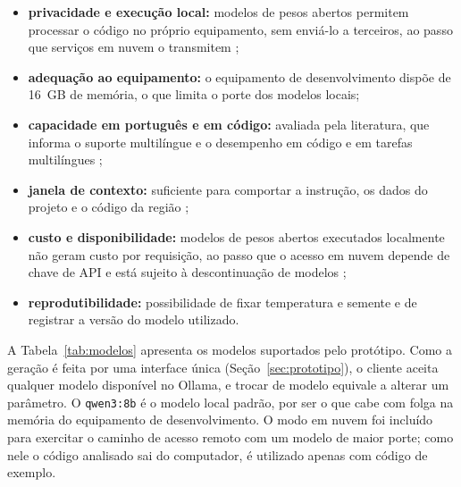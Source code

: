 \documentclass[
    12pt,                   %
    openright,              %
    oneside,                %
    a4paper,                %
    sumario=tradicional,    %
    english,                %
    brazil,                 %
    ]{abntex2}
\begin{document}
\begin{itemize}
  \item \textbf{privacidade e execução local:} modelos de pesos abertos permitem processar o código no próprio equipamento, sem enviá-lo a terceiros, ao passo que serviços em nuvem o transmitem \cite{ollama2026nuvem};
  \item \textbf{adequação ao equipamento:} o equipamento de desenvolvimento dispõe de 16~GB de memória, o que limita o porte dos modelos locais;
  \item \textbf{capacidade em português e em código:} avaliada pela literatura, que informa o suporte multilíngue \cite{yang2025qwen3} e o desempenho em código e em tarefas multilíngues \cite{bi2025gptoss};
  \item \textbf{janela de contexto:} suficiente para comportar a instrução, os dados do projeto e o código da região \cite{ollama2026qwen3,ollama2026gemma4};
  \item \textbf{custo e disponibilidade:} modelos de pesos abertos executados localmente não geram custo por requisição, ao passo que o acesso em nuvem depende de chave de API e está sujeito à descontinuação de modelos \cite{ollama2026nuvem};
  \item \textbf{reprodutibilidade:} possibilidade de fixar temperatura e semente e de registrar a versão do modelo utilizado.
\end{itemize}

A Tabela~\ref{tab:modelos} apresenta os modelos suportados pelo protótipo. Como a geração é feita por uma interface única (Seção~\ref{sec:prototipo}), o cliente aceita qualquer modelo disponível no Ollama, e trocar de modelo equivale a alterar um parâmetro. O \texttt{qwen3:8b} é o modelo local padrão, por ser o que cabe com folga na memória do equipamento de desenvolvimento. O modo em nuvem foi incluído para exercitar o caminho de acesso remoto com um modelo de maior porte; como nele o código analisado sai do computador, é utilizado apenas com código de exemplo.
\end{document}
